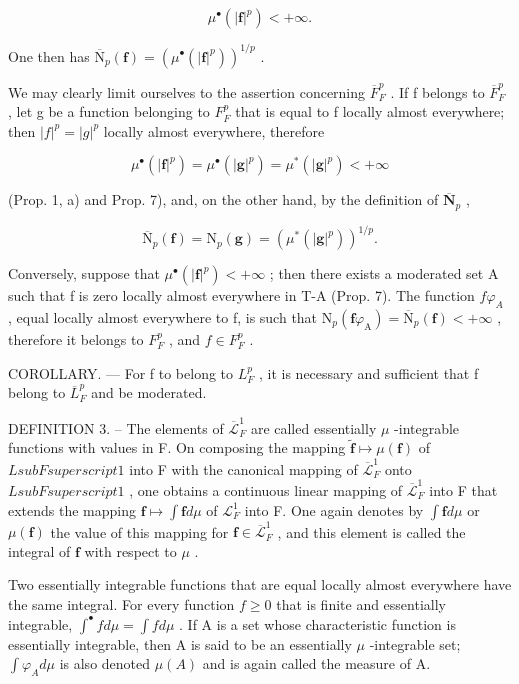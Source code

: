 \[
\mu^ {\bullet} (| \mathbf {f} | ^ {p}) <   + \infty .
\]

One then has \(\overline{\mathrm{N}}_p(\mathbf{f}) = (\mu^\bullet (|\mathbf{f}|^p))^{1 / p}\) .

We may clearly limit ourselves to the assertion concerning \(\overline{F}_{F}^{p}\) . If f belongs to \(\overline{F}_{F}^{p}\) , let g be a function belonging to \(F_{F}^{p}\) that is equal to f locally almost everywhere; then \(|f|^{p}=|g|^{p}\) locally almost everywhere, therefore

\[
\mu^ {\bullet} (| \mathbf {f} | ^ {p}) = \mu^ {\bullet} (| \mathbf {g} | ^ {p}) = \mu^ {*} (| \mathbf {g} | ^ {p}) <   + \infty
\]

(Prop. 1, a) and Prop. 7), and, on the other hand, by the definition of \(\overline{\mathbf{N}}_p\) ,

\[
\overline {{\mathrm{N}}} _ {p} (\mathbf {f}) = \mathrm{N} _ {p} (\mathbf {g}) = \left(\mu^ {*} (| \mathbf {g} | ^ {p})\right) ^ {1 / p}.
\]

Conversely, suppose that \(\mu^{\bullet}(|\mathbf{f}|^{p}) < +\infty\) ; then there exists a moderated set A such that f is zero locally almost everywhere in T-A (Prop. 7). The function \(f\varphi_{A}\) , equal locally almost everywhere to f, is such that \(\mathrm{N}_{p}(\mathbf{f}\varphi_{\mathrm{A}}) = \overline{\mathrm{N}}_{p}(\mathbf{f}) < +\infty\) , therefore it belongs to \(F_{F}^{p}\) , and \(f \in F_{F}^{p}\) .

COROLLARY. --- For f to belong to \(L_{F}^{p}\) , it is necessary and sufficient that f belong to \(\overline{L}_{F}^{p}\) and be moderated.

DEFINITION 3. -- The elements of \(\overline{\mathcal{L}}_F^1\) are called essentially \(\mu\) -integrable functions with values in F. On composing the mapping \(\widetilde{\mathbf{f}} \mapsto \mu(\mathbf{f})\) of \(L sub F superscript 1\) into F with the canonical mapping of \(\overline{\mathcal{L}}_F^1\) onto \(L sub F superscript 1\) , one obtains a continuous linear mapping of \(\overline{\mathcal{L}}_F^1\) into F that extends the mapping \(\mathbf{f} \mapsto \int \mathbf{f} d\mu\) of \(\mathcal{L}_F^1\) into F. One again denotes by \(\int \mathbf{f} d\mu\) or \(\mu(\mathbf{f})\) the value of this mapping for \(\mathbf{f} \in \overline{\mathcal{L}}_F^1\) , and this element is called the integral of \(\mathbf{f}\) with respect to \(\mu\) .

Two essentially integrable functions that are equal locally almost everywhere have the same integral. For every function \(f \geqslant 0\) that is finite and essentially integrable, \(\int^{\bullet} f d\mu = \int f d\mu\) . If A is a set whose characteristic function is essentially integrable, then A is said to be an essentially \(\mu\) -integrable set; \(\int \varphi_{A} d\mu\) is also denoted \(\mu(A)\) and is again called the measure of A.

